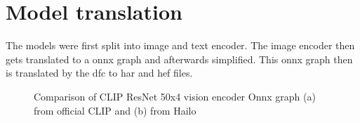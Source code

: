 \section{Model translation}
The models were first split into image and text encoder.
The image encoder then gets translated to a onnx graph and afterwards simplified.
This onnx graph then is translated by the \acrshort{dfc} to \acrshort{har} and \acrshort{hef} files.

\begin{figure}
    \centering
    \qquad
    \caption{Comparison of CLIP ResNet 50x4 vision encoder Onnx graph (a) from official CLIP and (b) from Hailo}
    \label{fig:implementation:compareRN50x4}
\end{figure}

